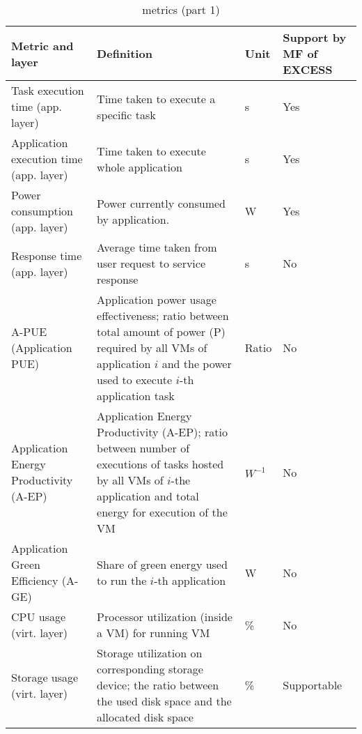 \documentclass[10pt,letterpaper]{IEEEtran}
\begin{document}
\begin{table}
\caption{\ECO metrics (part 1)}
\label{e2c1}
\small
\begin{center}
\begin{tabular}{|m{1.5cm}|m{4cm}|m{0.5cm}|m{1.3cm}|}
\hline
Metric and layer & Definition & Unit & Support by MF of EXCESS \\ \hline \hline
Task execution time (app. layer) & Time taken to execute a specific task & s & Yes \\ \hline
Application execution time (app. layer) & Time taken to execute whole application & s & Yes\\ \hline
Power consumption (app. layer) & Power currently consumed by application.
& W & Yes \\ \hline
Response time (app. layer) & Average time taken from user request to service response
& s & No\\ \hline
A-PUE (Application PUE) & Application power usage effectiveness; ratio between
total amount of power (P) required by all VMs of application $i$ and the power used to execute $i$-th application task & Ratio & No \\ \hline
Application Energy Productivity (A-EP) & Application Energy Productivity (A-EP);
ratio between number of executions of tasks hosted by all VMs of $i$-the
application and total energy for execution of the VM & $W^{-1}$ & No \\ \hline
Application Green Efficiency (A-GE) & Share of green energy used to run the $i$-th application
& W & No \\ \hline
CPU usage (virt. layer) & Processor utilization (inside a VM) for running VM
& \% & No \\ \hline
Storage usage (virt. layer) & Storage utilization on corresponding storage device; the ratio between
the used disk space and the allocated disk space & \% & Supportable \\ \hline
\end{tabular}
\end{center}
\end{table}
\end{document}
